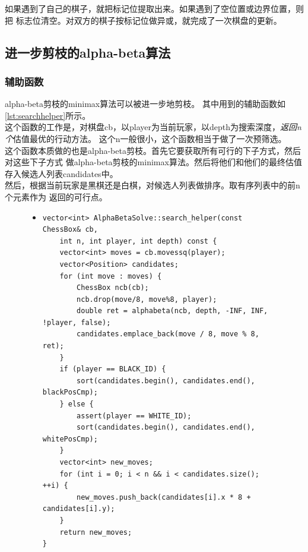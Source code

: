 \documentclass[a4paper]{article}
\begin{document}
如果遇到了自己的棋子，就把标记位提取出来。如果遇到了空位置或边界位置，则把
标志位清空。对双方的棋子按标记位做异或，就完成了一次棋盘的更新。

\subsection{进一步剪枝的alpha-beta算法}
\subsubsection{辅助函数}\label{subsec:ab-trunc-helper}
alpha-beta剪枝的minimax算法可以被进一步地剪枝。
其中用到的辅助函数如\autoref{lst:searchhelper}所示。\\

这个函数的工作是，对棋盘cb，以player为当前玩家，以depth为搜索深度，\emph{返回n个}估值最优的行动方法。
这个n一般很小，这个函数相当于做了一次预筛选。\\

这个函数本质做的也是alpha-beta剪枝。首先它要获取所有可行的下子方式，然后对这些下子方式
做alpha-beta剪枝的minimax算法。然后将他们和他们的最终估值存入候选人列表candidates中。\\

然后，根据当前玩家是黑棋还是白棋，对候选人列表做排序。取有序列表中的前n个元素作为
返回的可行点。\\

\begin{figure}[!hbt]
\begin{itemize}
\item[] \begin{lstlisting}[style=mycpp, label=lst:searchhelper, caption=行动方案预筛选函数]
vector<int> AlphaBetaSolve::search_helper(const ChessBox& cb, 
    int n, int player, int depth) const {
    vector<int> moves = cb.movessq(player);
    vector<Position> candidates;
    for (int move : moves) {
        ChessBox ncb(cb);
        ncb.drop(move/8, move%8, player);
        double ret = alphabeta(ncb, depth, -INF, INF, !player, false);
        candidates.emplace_back(move / 8, move % 8, ret);
    }
    if (player == BLACK_ID) {
        sort(candidates.begin(), candidates.end(), blackPosCmp);
    } else {
        assert(player == WHITE_ID);
        sort(candidates.begin(), candidates.end(), whitePosCmp);
    }
    vector<int> new_moves;
    for (int i = 0; i < n && i < candidates.size(); ++i) {
        new_moves.push_back(candidates[i].x * 8 + candidates[i].y);
    }
    return new_moves;
}
\end{lstlisting}
\end{itemize}
\end{figure}
\end{document}
